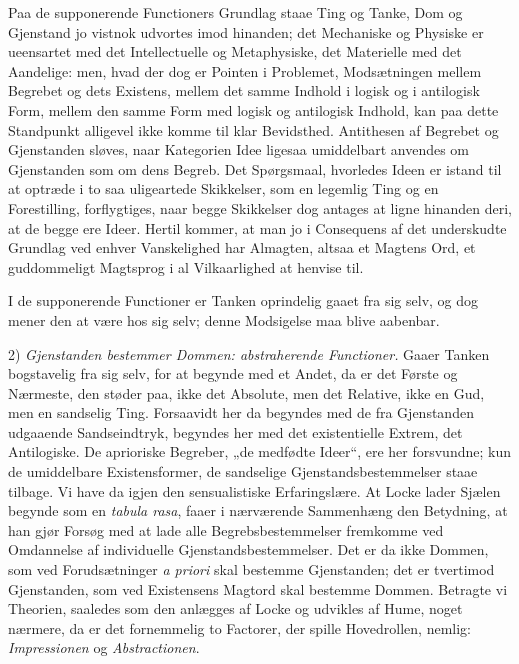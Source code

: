 \documentclass[12pt]{book}
\newcommand{\opage}[1]{\marginnote{\footnotesize\textit{[#1]}}}
\begin{document}
Paa de supponerende Functioners Grundlag staae Ting
og Tanke, Dom og Gjenstand jo vistnok udvortes imod hinanden;
det Mechaniske og Physiske er ueensartet med det Intellectuelle
og Metaphysiske, det Materielle med det Aandelige:
men, hvad der dog er Pointen i Problemet, Modsætningen
mellem Begrebet og dets Existens, mellem det samme Indhold
i logisk og i antilogisk Form, mellem den samme Form med
logisk og antilogisk Indhold, kan paa dette Standpunkt alligevel
ikke komme til klar Bevidsthed. Antithesen af Begrebet og
Gjenstanden sløves, naar Kategorien Idee ligesaa umiddelbart
anvendes om Gjenstanden som om dens Begreb. Det Spørgsmaal,
hvorledes Ideen er istand til at optræde i to saa uligeartede
Skikkelser, som en legemlig Ting og en Forestilling, forflygtiges,
naar begge Skikkelser dog antages at ligne hinanden
deri, at de begge ere Ideer. Hertil kommer, at man jo i
Consequens af det underskudte Grundlag ved enhver Vanskelighed
har Almagten, altsaa et Magtens Ord, et guddommeligt
Magtsprog i al Vilkaarlighed at henvise til.

I de supponerende Functioner er Tanken oprindelig gaaet
fra sig selv, og dog mener den at være hos sig selv; denne
Modsigelse maa blive aabenbar.

2) \emph{Gjenstanden bestemmer Dommen: abstraherende
\opage{108}Functioner.} Gaaer Tanken bogstavelig fra sig
selv, for at begynde med et Andet, da er det Første og Nærmeste,
den støder paa, ikke det Absolute, men det Relative, ikke
en Gud, men en sandselig Ting. Forsaavidt her da begyndes
med de fra Gjenstanden udgaaende Sandseindtryk, begyndes
her med det existentielle Extrem, det Antilogiske. De aprioriske
Begreber, „de medfødte Ideer“, ere her forsvundne; kun
de umiddelbare Existensformer, de sandselige Gjenstandsbestemmelser
staae tilbage. Vi have da igjen den sensualistiske
Erfaringslære. At Locke lader Sjælen begynde som en \textit{tabula
rasa}, faaer i nærværende Sammenhæng den Betydning, at
han gjør Forsøg med at lade alle Begrebsbestemmelser fremkomme
ved Omdannelse af individuelle Gjenstandsbestemmelser.
Det er da ikke Dommen, som ved Forudsætninger \textit{a priori}
skal bestemme Gjenstanden; det er tvertimod Gjenstanden, som
ved Existensens Magtord skal bestemme Dommen. Betragte
vi Theorien, saaledes som den anlægges af Locke og udvikles
af Hume, noget nærmere, da er det fornemmelig to Factorer,
der spille Hovedrollen, nemlig: \emph{Impressionen} og \emph{Abstractionen}.
\end{document}
